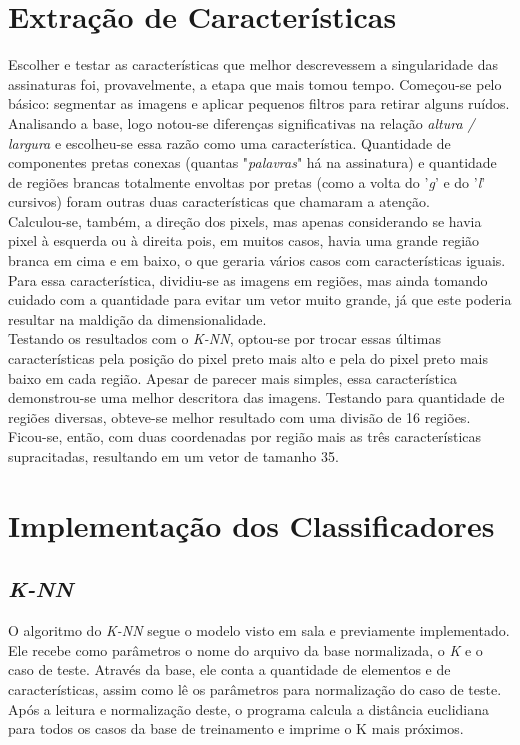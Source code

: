 \documentclass[a4paper,12pt]{article}
\begin{document}
\section{Extração de Características}
Escolher e testar as características que melhor descrevessem a singularidade das
 assinaturas foi, provavelmente, a etapa que mais tomou tempo. Começou-se
pelo básico: segmentar as imagens e aplicar pequenos filtros para retirar
alguns ruídos. Analisando a base, logo notou-se diferenças significativas na
relação \textit{altura / largura} e escolheu-se essa razão como uma
característica. Quantidade de componentes pretas conexas (quantas 
"\textit{palavras}" há na assinatura) e quantidade de regiões brancas totalmente
 envoltas por pretas (como a volta do '\textit{g}' e do '\textit{l}' cursivos)
foram outras duas características que chamaram a atenção.\\
Calculou-se, também, a direção dos pixels, mas apenas considerando se havia pixel
 à esquerda ou à direita pois, em muitos casos, havia uma grande região branca
 em cima e em baixo, o que geraria vários casos com características iguais. Para
 essa característica, dividiu-se as imagens em regiões, mas ainda tomando cuidado
 com a quantidade para evitar um vetor muito grande, já que este poderia
 resultar na maldição da dimensionalidade.\\
Testando os resultados com o \textit{K-NN}, optou-se por trocar essas últimas
características pela posição do pixel preto mais alto e pela do pixel preto mais
 baixo em cada região. Apesar de parecer mais simples, essa característica
 demonstrou-se uma melhor descritora das imagens. Testando para quantidade de
 regiões diversas, obteve-se melhor resultado com uma divisão de 16 regiões.\\
Ficou-se, então, com duas coordenadas por região mais as três características
 supracitadas, resultando em um vetor de tamanho 35.

\section{Implementação dos Classificadores}
\subsection{\textit{K-NN}}
O algoritmo do \textit{K-NN} segue o modelo visto em sala e previamente implementado.
Ele recebe como parâmetros o nome do arquivo da base normalizada, o \textit{K}
e o caso de teste. Através da base, ele conta a quantidade de elementos e de
características, assim como lê os parâmetros para normalização do caso de teste.
 Após a leitura e normalização deste, o programa calcula a distância euclidiana
para todos os casos da base de treinamento e imprime o K mais próximos. 
\end{document}
